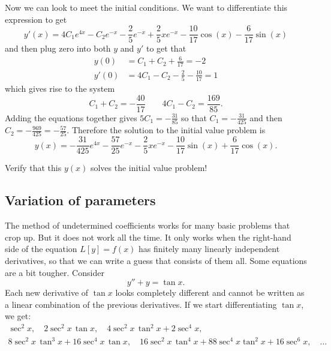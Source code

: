 \documentclass{ximera}
\begin{document}
\begin{exampleSol}
    Now we can look to meet the initial conditions. We want to differentiate this expression to get
    \begin{equation*}
        y'(x) = 4C_1e^{4x} - C_2e^{-x} - \frac{2}{5}e^{-x} + \frac{2}{5}xe^{-x} - \frac{10}{17}\cos(x) - \frac{6}{17}\sin(x)
    \end{equation*}
    and then plug zero into both $y$ and $y'$ to get that
    \begin{equation*}
        \begin{split}
            y(0) &= C_1 + C_2 + \frac{6}{17} = -2 \\
            y'(0) &= 4C_1 - C_2 - \frac{2}{5} - \frac{10}{17} = 1
        \end{split}
    \end{equation*}
    which gives rise to the system
    \begin{equation*}
        C_1 + C_2 = -\frac{40}{17} \qquad 4C_1 - C_2 = \frac{169}{85}.
    \end{equation*}
    Adding the equations together gives $5C_1 = - \frac{31}{85}$ so that $C_1 = -\frac{31}{425}$ and then $C_2 = -\frac{969}{425} = -\frac{57}{25}$. Therefore the solution to the initial value problem is
    \begin{equation*}
        y(x) = -\frac{31}{425}e^{4x} - \frac{57}{25}e^{-x} - \frac{2}{5}xe^{-x} - \frac{10}{17}\sin(x) + \frac{6}{17}\cos(x).
    \end{equation*}
\end{exampleSol}

\begin{exercise}
    Verify that this $y(x)$ solves the initial value problem!
\end{exercise}

\subsection{Variation of parameters}

The method of undetermined coefficients works for many basic problems that crop up.  But it does not work all the time.  It only works when the right-hand side of the equation $L[y] = f(x)$ has finitely many linearly independent derivatives, so that we can write a guess that consists of them all.  Some equations are a bit tougher.  Consider
\begin{equation*}
    y''+y = \tan x .
\end{equation*}
Each new derivative of $\tan x$ looks completely different and cannot be written as a linear combination of the previous derivatives. If we start differentiating $\tan x$, we get:
\begin{multline*}
    \sec^2 x, \quad 2\sec^2 x \, \tan x, \quad 4 \sec^2 x \, \tan^2 x + 2 \sec^4 x, \\
    8 \sec^2 x \, \tan^3 x + 16 \sec^4 x \, \tan x, \quad 16\sec^2 x \, \tan^4 x + 88 \sec^4 x \tan^2 x + 16 \sec^6 x, \quad \ldots
\end{multline*}
\end{document}
